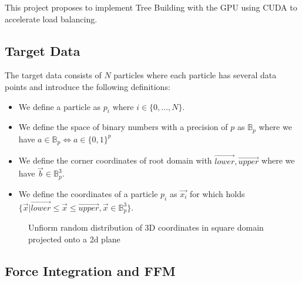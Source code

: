 \documentclass[]{article}
\begin{document}
This project proposes to implement Tree Building with the GPU using CUDA to accelerate load balancing.

\subsection{Target Data}\label{section:target-data}


The target data consists of $N$ particles where each particle has several data points and introduce the following definitions:

\begin{itemize}
	\item We define a particle as $p_i$  where $i \in \{0,...,N\}$. 
	\item We define the space of binary numbers with a precision of $p$ as $\mathbb{B}_p$ where we have $a \in \mathbb{B}_p \Leftrightarrow a \in \{0,1\}^{p}$
	\item We define the corner coordinates of root domain with $\vec{lower}, \vec{upper}$ where we have $\vec{b} \in \mathbb{B}_p^3$. 
	\item We define the coordinates of a particle $p_i$ as $\vec{x_i}$ for which holds $\{\vec{x} | \vec{lower} \leq \vec{x} \leq \vec{upper}, \vec{x} \in \mathbb{B}_p^3 \}$.

\end{itemize}

\begin{figure}[H]
	\begin{center}
	\end{center}
\caption{Unfiorm random distribution of 3D coordinates in square domain projected onto a 2d plane}
\end{figure}


\subsection{Force Integration and FFM}\label{section:force-integration}
\end{document}
